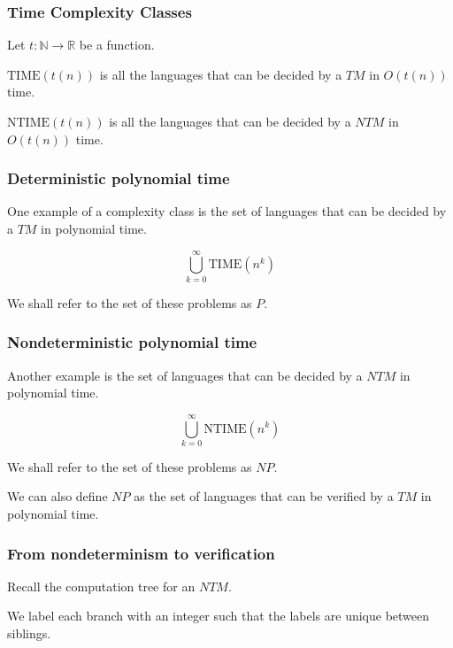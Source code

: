 \documentclass[aspectratio=169]{beamer}
\begin{document}
\begin{frame}
\frametitle{Time Complexity Classes}
Let $t: \mathbb{N} \to \mathbb{R}$ be a function.

$\mathrm{TIME}(t(n))$ is all the languages that can be decided by a $TM$ in $O(t(n))$ time.

$\mathrm{NTIME}(t(n))$ is all the languages that can be decided by a $NTM$ in $O(t(n))$ time.
\end{frame}

\begin{frame}
\frametitle{Deterministic polynomial time}
One example of a complexity class is the set of languages that can be decided by a $TM$ in polynomial time.

$$\bigcup_{k = 0}^{\infty} \mathrm{TIME}(n^k)$$

We shall refer to the set of these problems as $P$.
\end{frame}

\begin{frame}
\frametitle{Nondeterministic polynomial time}
Another example is the set of languages that can be decided by a $NTM$ in polynomial time.

$$\bigcup_{k = 0}^{\infty} \mathrm{NTIME}(n^k)$$

We shall refer to the set of these problems as $NP$.

We can also define $NP$ as the set of languages that can be verified by a $TM$ in polynomial time.
\end{frame}

\begin{frame}
\frametitle{From nondeterminism to verification}
Recall the computation tree for an $NTM$.
\begin{center}
\end{center}

We label each branch with an integer such that the labels are unique between siblings.
\end{frame}
\end{document}

